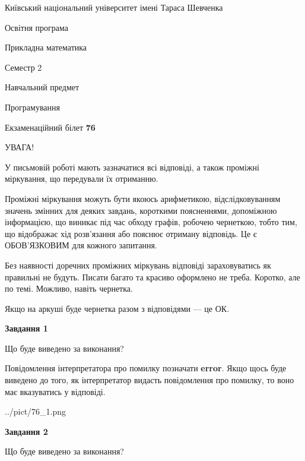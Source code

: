 \documentclass[12pt, ukrainian]{article}
\begin{document}
{{\begin {small}\par
{ \center  Київський національний університет імені Тараса Шевченка \par}
{\parbox {5 cm}{Освітня програма \hfill}{\parbox {7 cm}{Прикладна математика \hfill}}\parbox {6 cm}{\hfill Семестр 2}}\par
{\parbox {5 cm} {Навчальний предмет \hfill}\parbox {7 cm}{Програмування \hfill}\parbox {6cm}{\hfill}\par}\vspace{-7pt} \end{small}}{\center Екзаменаційний білет \No \textbf
{ 76 }\par}}
{
\begin {large}
УВАГА!

У письмовій роботі мають зазначатися всі відповіді, а також проміжні міркування, що передували їх отриманню.

Проміжні міркування можуть бути якоюсь арифметикою, відслідковуванням зна\-чень змінних для деяких завдань,
короткими поясненнями, допоміжною інформацією, що виникає під час обходу графів, робочею чернеткою,
тобто тим, що відображає хід розв’язання або пояснює отриману відповідь.
Це є ОБОВ’ЯЗКОВИМ для кожного запитання.

Без наявності доречних проміжних міркувань відповіді зараховуватись як правиль\-ні не будуть.
Писати багато та красиво оформлено не треба. Коротко, але по темі. Можли\-во, навіть чернетка.

Якщо на аркуші буде чернетка разом з відповідями --- це ОК.

\newpage

{\begin {center}\textbf{Завдання 1}\end {center}}\par
Що буде виведено за виконання?

Повідомлення інтерпретатора про помилку позначати \textbf{error}.
Якщо щось буде виведено до того, як інтерпретатор видасть повідомлення про помилку, 
то воно має вказуватись у відповіді. \par


\begin{center}
	{../pict/76_1.png}
\end{center}
\newpage

{\begin {center}\textbf{Завдання 2}\end {center}}\par
Що буде виведено за виконання?


\end{large}}
\end{document}
